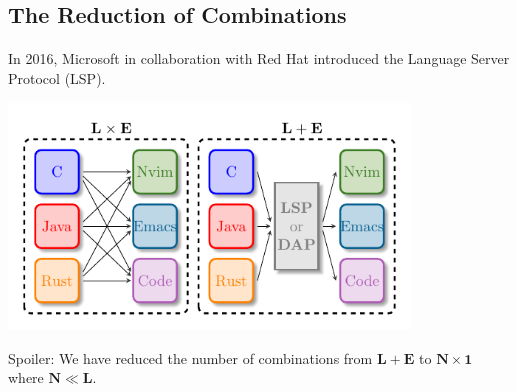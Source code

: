 \documentclass[9pt,xcolor=table,svgnames]{beamer}
\begin{document}
\subsection[The Reductions of Combinations]{The Reduction of Combinations}
\begin{frame}{\secname}
    \framesubtitle{\subsecname}

    In 2016, \alert{Microsoft} in collaboration with \alert{Red Hat} introduced the \alert{Language Server Protocol} (LSP).

    \pause
    \begin{center}
    \includegraphics[width=0.8\textwidth]{figs/lsp-combination.pdf}
    \end{center}

    \pause

    \huge Spoiler:
    \normalsize We have reduced the number of combinations from $\mathbf{L} + \mathbf{E}$ to $\mathbf{N} \times \mathbf{1}$ where $\mathbf{N} \ll \mathbf{L}$.
\end{frame}
\end{document}
